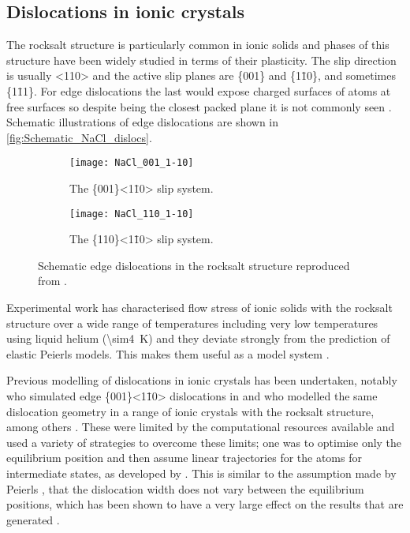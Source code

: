 \subsection{Dislocations in ionic crystals}
The rocksalt structure is particularly common in ionic solids and phases of this structure have been widely studied in terms of their plasticity. The slip direction is usually <110> and the active slip planes are \{001\} and \{1\={1}0\}, and sometimes \{1\={1}1\}. For edge dislocations the last would expose charged surfaces of atoms at free surfaces so despite being the closest packed plane it is not commonly seen \cite{Haasen1985}. Schematic illustrations of edge dislocations are shown in \autoref{fig:Schematic_NaCl_dislocs}.

\begin{figure}
\centering
    \begin{subfigure}{0.8\textwidth}
    \centering
    \texttt{[image: NaCl\_001\_1-10]}
    \caption{The \{001\}<1\={1}0> slip system.\label{fig:NaCl_110_001_core_structure}}
    \end{subfigure}
\par\bigskip
    \begin{subfigure}{0.8\textwidth}
    \centering
    \texttt{[image: NaCl\_110\_1-10]}
    \caption{The \{110\}<1\={1}0> slip system.\label{fig:NaCl_110_110_core_structure}}
    \end{subfigure}
\caption[Edge dislocations in the rock salt crystals.]{Schematic edge dislocations in the rocksalt structure reproduced from \cite{Haasen1985}. \label{fig:Schematic_NaCl_dislocs}}
\end{figure}





Experimental work has characterised flow stress of ionic solids with the rocksalt structure over a wide range of temperatures including very low temperatures using liquid helium (\SI{\sim4}{\kelvin}) and they deviate strongly from the prediction of elastic Peierls models. This makes them useful as a model system \cite{Haasen1985}.

Previous modelling of dislocations in ionic crystals has been undertaken, notably \citet{puls1976} who simulated edge \{001\}<1\={1}0> dislocations in  and \citet{Woo1977} who modelled the same dislocation geometry in a range of ionic crystals with the rocksalt structure, among others \cite{Granzer1968,Woo1976,Hoagland1976,Brandt1987,Soullard1991,Foitzik1991}. These were limited by the computational resources available and used a variety of strategies to overcome these limits; one was to optimise only the equilibrium position and then assume linear trajectories for the atoms for intermediate states, as developed by \citet{Granzer1968}. This is similar to the assumption made by Peierls \cite{Peierls1940}, that the dislocation width does not vary between the equilibrium positions, which has been shown to have a very large effect on the results that are generated \cite{Clegg2006}.


